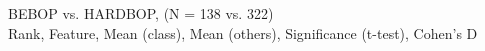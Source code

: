 BEBOP vs. HARDBOP, (N = 138 vs. 322)\\
Rank, Feature, Mean (class), Mean (others), Significance (t-test), Cohen's D\\
